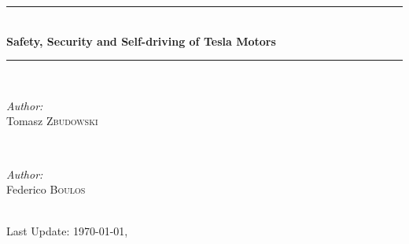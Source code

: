 \documentclass{article} %
\begin{document}
\begin{titlepage}

\newcommand{\HRule}{\rule{\linewidth}{0.5mm}} %

\center %

\HRule \\[0.4cm]
{ \huge \bfseries Safety, Security and Self-driving of Tesla Motors}\\[0.4cm] %
\HRule \\[1.5cm]

\begin{minipage}{0.4\textwidth}
\begin{flushleft} \large
\emph{Author:}\\
Tomasz \textsc{Zbudowski} %
\end{flushleft}
\end{minipage}
~
\begin{minipage}{0.4\textwidth}
\begin{flushright} \large
\emph{Author:} \\
 Federico \textsc{Boulos} 
\end{flushright}
\end{minipage}\\[4cm]

{\large Last Update: \ddmmyyyydate\today, \currenttime}\\[3cm] %


\vfill %

\end{titlepage}


\tableofcontents %

\newpage %


\end{document}

